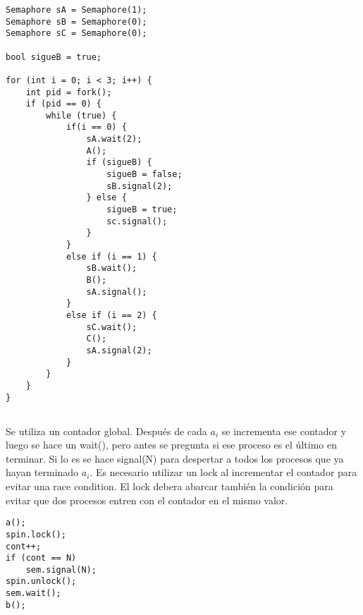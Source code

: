 \subsubsection{}

\begin{codesnippet}
\begin{verbatim}
Semaphore sA = Semaphore(1);
Semaphore sB = Semaphore(0);
Semaphore sC = Semaphore(0);

bool sigueB = true;

for (int i = 0; i < 3; i++) {
    int pid = fork();
    if (pid == 0) {
        while (true) {
            if(i == 0) {
                sA.wait(2);
                A();
                if (sigueB) {
                    sigueB = false;
                    sB.signal(2);
                } else {
                    sigueB = true;
                    sc.signal();
                }
            }
            else if (i == 1) {
                sB.wait();
                B();
                sA.signal();
            }
            else if (i == 2) {
                sC.wait();
                C();
                sA.signal(2);
            }
        }
    }
}
\end{verbatim}
\end{codesnippet}

\subsection{}

Se utiliza un contador global. Después de cada $a_i$ se incrementa ese
contador y luego se hace un wait(), pero antes se pregunta si ese proceso es
el último en terminar. Si lo es se hace signal(N) para despertar a todos los
procesos que ya hayan terminado $a_i$. Es necesario utilizar un lock al
incrementar el contador para evitar una race condition. El lock debera abarcar
también la condición para evitar que dos procesos entren con el contador en
el mismo valor.

\begin{codesnippet}
\begin{verbatim}
a();
spin.lock();
cont++;
if (cont == N)
    sem.signal(N);
spin.unlock();
sem.wait();
b();
\end{verbatim}
\end{codesnippet}

\subsection{}

